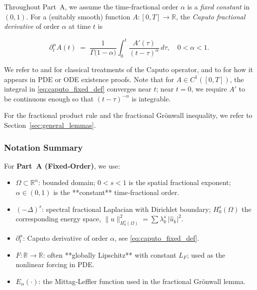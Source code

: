 \documentclass[12pt]{article}
\begin{document}
Throughout Part~A, we assume the time‐fractional order $\alpha$ is a 
\emph{fixed constant} in $(0,1)$. For a (suitably smooth) function 
$A:[0,T]\to \mathbb{R}$, the \emph{Caputo fractional derivative} of order 
$\alpha$ at time $t$ is

\begin{equation}
\label{eq:caputo_fixed_def}
\partial_t^\alpha A(t)
\;=\;
\frac{1}{\Gamma\bigl(1-\alpha\bigr)}
\int_0^t
  \frac{A'(\tau)}{(t-\tau)^\alpha}
\,d\tau,
\quad
0 < \alpha < 1.
\end{equation}

We refer to \cite[Ch.~2]{Diethelm2010} and \cite[Sec.~2.4]{Kilbas2006} for classical 
treatments of the Caputo operator, and to \cite[Ch.~7]{Diethelm2010} for how it appears 
in PDE or ODE existence proofs. Note that for $A\in C^1([0,T])$, the integral in 
\eqref{eq:caputo_fixed_def} converges near $t$; near $t=0$, we require $A'$ to be 
continuous enough so that $(t-\tau)^{-\alpha}$ is integrable.

For the fractional product rule and the fractional Grönwall inequality, we refer to Section~\ref{sec:general_lemmas}.


\subsubsection{Notation Summary}
\label{subsubsec:notation_summary}

For \textbf{Part~A (Fixed‐Order)}, we use:

\begin{itemize}
\item $\Omega\subset \mathbb{R}^n$: bounded domain; $0<s<1$ is the spatial 
      fractional exponent; $\alpha\in(0,1)$ is the **constant** time‐fractional order.
\item $(-\Delta)^s$: spectral fractional Laplacian with Dirichlet boundary; 
      $H_0^s(\Omega)$ the corresponding energy space, 
      $\|u\|_{H_0^s(\Omega)}^2 = \sum \lambda_k^s \,\lvert \hat{u}_k\rvert^2$.
\item $\partial_t^\alpha$: Caputo derivative of order $\alpha$, 
      see \eqref{eq:caputo_fixed_def}.
\item $F:\mathbb{R}\to\mathbb{R}$: often **globally Lipschitz** with constant $L_F$; 
      used as the nonlinear forcing in PDE.
\item $E_\alpha(\cdot)$: the Mittag‐Leffler function used in the fractional Gr\"onwall lemma.
\end{itemize}
\end{document}

